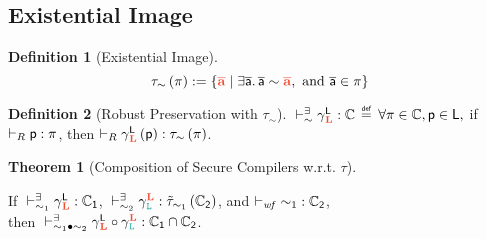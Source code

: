 \documentclass[acmsmall]{acmart}
\theoremstyle{definition}
\newtheorem{theorem}{Theorem}[section]
\newtheorem{definition}{Definition}[section]
\begin{document}


\newpage




\appendix
\subsection{Existential Image}\label{subsec:extimg}

\begin{definition}[Existential Image]
\label{def:existential:img}\label{def:tau}
  \[
    \tau_\sim\left(\src{\pi}\right) := 
      \left\{ 
        \trg{\trace} \mid \exists \src{\trace}\ldotp \src{\trace}\sim\trg{\trace}, \text{ and } \src{\trace}\in\src{\pi} 
      \right\}
  \]
\end{definition}

\begin{definition}[Robust Preservation with $\tau_\sim$]\label{def:rtp:tau}
  {$\rtptau{\cc{\src{L}}{\trg{L}}}{\src{\class}}{\sim}$}
  $\isdef$
    {$\forall \src{\pi}\in\src{\class}, \src{p}\in\src{L},$} if {$\rsat{\src{\progvar}}{\src{\pi}}$}, then {$\rsat{\cc{\src{L}}{\trg{L}}\left(\src{p}\right)}{\tau_\sim\left(\src{\pi}\right)}$}.
\end{definition}

\begin{theorem}[Composition of Secure Compilers w.r.t. $\tau$]\label{thm:rtpsim:tau}
  $\;$ 

  If {$\rtptau{\cc{\src{L}}{\trg{L}}}{\src{\class[_{1}]}}{\sim_1}$}, {$\rtptau{\cc{\trg{L}}{\obj{L}}}{\tilde{\tau}_{\sim_1}\left(\src{\class[_2]}\right)}{\sim_2}$}, and {$\wfctau{\sim_1}{\src{\class[_2]}}$}, \\ then {$\rtptau{\cc{\src{L}}{\trg{L}}\circ\cc{\trg{L}}{\obj{L}}}{\src{\class[_{1}]}\cap\src{\class[_{2}]}}{\sim_1\bullet\sim_2}$}. \Coqed
\end{theorem}
\end{document}
